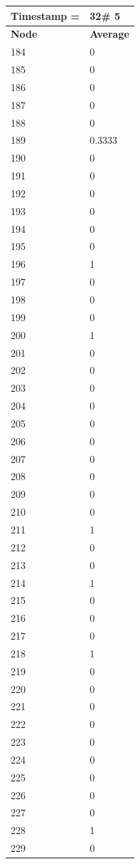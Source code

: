 \begin{tabular}{|l||l|}
\hline
\textbf{Timestamp =} & \textbf{32}\# 5\\\hline
	\textbf{Node} & \textbf{Average} \\ \hline
\hline
	184 & 0 \\ \hline
	185 & 0 \\ \hline
	186 & 0 \\ \hline
	187 & 0 \\ \hline
	188 & 0 \\ \hline
	189 & 0.3333 \\ \hline
	190 & 0 \\ \hline
	191 & 0 \\ \hline
	192 & 0 \\ \hline
	193 & 0 \\ \hline
	194 & 0 \\ \hline
	195 & 0 \\ \hline
	196 & 1 \\ \hline
	197 & 0 \\ \hline
	198 & 0 \\ \hline
	199 & 0 \\ \hline
	200 & 1 \\ \hline
	201 & 0 \\ \hline
	202 & 0 \\ \hline
	203 & 0 \\ \hline
	204 & 0 \\ \hline
	205 & 0 \\ \hline
	206 & 0 \\ \hline
	207 & 0 \\ \hline
	208 & 0 \\ \hline
	209 & 0 \\ \hline
	210 & 0 \\ \hline
	211 & 1 \\ \hline
	212 & 0 \\ \hline
	213 & 0 \\ \hline
	214 & 1 \\ \hline
	215 & 0 \\ \hline
	216 & 0 \\ \hline
	217 & 0 \\ \hline
	218 & 1 \\ \hline
	219 & 0 \\ \hline
	220 & 0 \\ \hline
	221 & 0 \\ \hline
	222 & 0 \\ \hline
	223 & 0 \\ \hline
	224 & 0 \\ \hline
	225 & 0 \\ \hline
	226 & 0 \\ \hline
	227 & 0 \\ \hline
	228 & 1 \\ \hline
	229 & 0 \\ \hline
\end{tabular}
